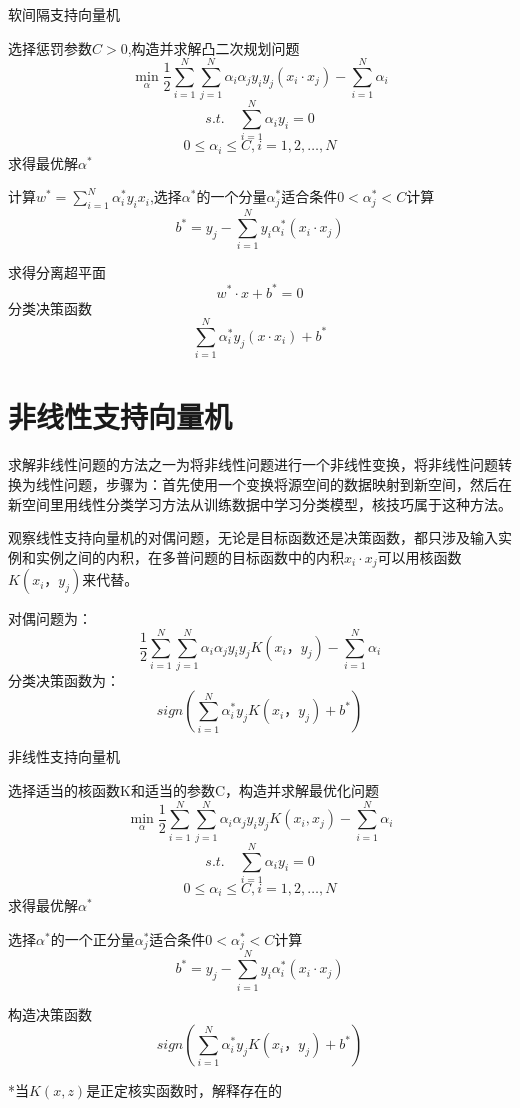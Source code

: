 \documentclass{article}
\begin{document}
	\begin{algorithm}[h]
		\caption{软间隔支持向量机}
		\LinesNumbered
		选择惩罚参数$C>0$,构造并求解凸二次规划问题$$	\mathop{min}_{\alpha }\frac{1}{2}\sum_{i=1}^{N}\sum_{j=1}^{N}\alpha _{i}\alpha _{j}y_{i}y_{j}\left ( x_{i}\cdot x_{j} \right )-\sum_{i=1}^{N}\alpha _{i}$$ $$s.t. \quad \sum_{i=1}^{N}\alpha _{i}y_{i}=0$$  $$0\leq \alpha _{i}\leq C,i=1,2,\ldots,N$$求得最优解$\alpha ^{*}$
		
		计算$w^{*}=\sum_{i=1}^{N}\alpha _{i}^{*}y_{i}x_{i}$,选择$\alpha ^{*}$的一个分量$\alpha ^{*}_{j}$适合条件$0<\alpha ^{*}_{j}<C$计算$$	b^{*}=y_{j}-\sum_{i=1}^{N}y_{i}\alpha _{i}^{*}\left ( x_{i}\cdot x_{j} \right )$$
		
		求得分离超平面$$w^{*}\cdot x+b^{*}=0$$分类决策函数$$	\sum_{i=1}^{N}\alpha _{i}^{*}y_{j}\left ( x\cdot x_{i} \right )+b^{*}$$
	\end{algorithm}
	\section{非线性支持向量机}
	求解非线性问题的方法之一为将非线性问题进行一个非线性变换，将非线性问题转换为线性问题，步骤为：首先使用一个变换将源空间的数据映射到新空间，然后在新空间里用线性分类学习方法从训练数据中学习分类模型，核技巧属于这种方法。
	
	观察线性支持向量机的对偶问题，无论是目标函数还是决策函数，都只涉及输入实例和实例之间的内积，在多普问题的目标函数中的内积$x_{i} \cdot x_{j}$可以用核函数$K\left ( x_{i}，y_{j} \right )$来代替。
	
	对偶问题为：
	\begin{equation}
	\frac{1}{2}\sum_{i=1}^{N}\sum_{j=1}^{N}\alpha _{i}\alpha _{j}y_{i}y_{j}K\left ( x_{i}，y_{j} \right )-\sum_{i=1}^{N}\alpha _{i}
	\end{equation}
	分类决策函数为：
	\begin{equation}
	sign(\sum_{i=1}^{N}\alpha _{i}^{*}y_{j}K\left ( x_{i}，y_{j} \right )+b^{*})
	\end{equation}
	\begin{algorithm}[h]
		\caption{非线性支持向量机}
		\LinesNumbered
		选择适当的核函数K和适当的参数C，构造并求解最优化问题$$	\mathop{min}_{\alpha }\frac{1}{2}\sum_{i=1}^{N}\sum_{j=1}^{N}\alpha _{i}\alpha _{j}y_{i}y_{j}K\left ( x_{i}, x_{j} \right )-\sum_{i=1}^{N}\alpha _{i}$$ $$s.t. \quad \sum_{i=1}^{N}\alpha _{i}y_{i}=0$$  $$0\leq \alpha _{i}\leq C,i=1,2,\ldots,N$$求得最优解$\alpha ^{*}$
		
		选择$\alpha ^{*}$的一个正分量$\alpha ^{*}_{j}$适合条件$0<\alpha ^{*}_{j}<C$计算$$	b^{*}=y_{j}-\sum_{i=1}^{N}y_{i}\alpha _{i}^{*}\left ( x_{i}\cdot x_{j} \right )$$
		
		构造决策函数$$sign(\sum_{i=1}^{N}\alpha _{i}^{*}y_{j}K\left ( x_{i}，y_{j} \right )+b^{*})$$
		
		*当$K(x,z)$是正定核实函数时，解释存在的
	\end{algorithm}
\end{document}

